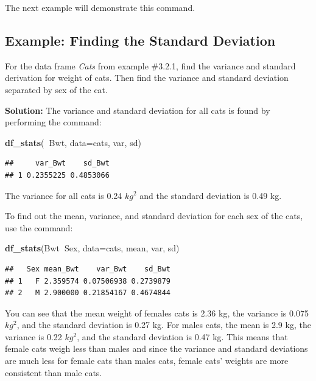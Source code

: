 \documentclass[
]{book}
\newenvironment{Shaded}{\begin{snugshade}}{\end{snugshade}}
\newcommand{\DataTypeTok}[1]{\textcolor[rgb]{0.13,0.29,0.53}{#1}}
\newcommand{\KeywordTok}[1]{\textcolor[rgb]{0.13,0.29,0.53}{\textbf{#1}}}
\newcommand{\NormalTok}[1]{#1}
\newcommand{\OperatorTok}[1]{\textcolor[rgb]{0.81,0.36,0.00}{\textbf{#1}}}
\begin{document}
The next example will demonstrate this command.

\hypertarget{example-finding-the-standard-deviation}{%
\subsection{Example: Finding the Standard Deviation}\label{example-finding-the-standard-deviation}}

For the data frame \emph{Cats} from example \#3.2.1, find the variance and standard derivation for weight of cats. Then find the variance and standard deviation separated by sex of the cat.

\textbf{Solution:}
The variance and standard deviation for all cats is found by performing the command:

\begin{Shaded}
\begin{Highlighting}[]
\KeywordTok{df_stats}\NormalTok{(}\OperatorTok{~}\NormalTok{Bwt, }\DataTypeTok{data=}\NormalTok{cats, var, sd)}
\end{Highlighting}
\end{Shaded}

\begin{verbatim}
##     var_Bwt    sd_Bwt
## 1 0.2355225 0.4853066
\end{verbatim}

The variance for all cats is 0.24 \(kg^2\) and the standard deviation is 0.49 kg.

To find out the mean, variance, and standard deviation for each sex of the cats, use the command:

\begin{Shaded}
\begin{Highlighting}[]
\KeywordTok{df_stats}\NormalTok{(Bwt}\OperatorTok{~}\NormalTok{Sex, }\DataTypeTok{data=}\NormalTok{cats, mean, var, sd)}
\end{Highlighting}
\end{Shaded}

\begin{verbatim}
##   Sex mean_Bwt    var_Bwt    sd_Bwt
## 1   F 2.359574 0.07506938 0.2739879
## 2   M 2.900000 0.21854167 0.4674844
\end{verbatim}

You can see that the mean weight of females cats is 2.36 kg, the variance is 0.075 \(kg^2\), and the standard deviation is 0.27 kg. For males cats, the mean is 2.9 kg, the variance is 0.22 \(kg^2\), and the standard deviation is 0.47 kg. This means that female cats weigh less than males and since the variance and standard deviations are much less for female cats than males cats, female cats' weights are more consistent than male cats.
\end{document}
